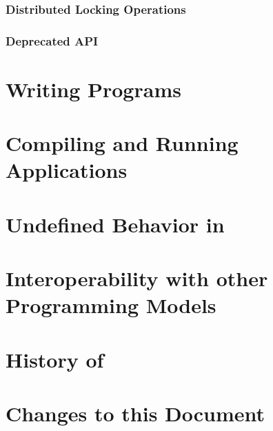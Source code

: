 \documentclass[10pt]{book}
\begin{document}
{%
\subsection{Distributed Locking Operations}
\subsection{Deprecated API}

\clearpage

\appendix
\chapter{Writing \openshmem Programs}

\chapter{Compiling and Running Applications}

\chapter{Undefined Behavior in \openshmem}
\label{sec:undefined}

\chapter{Interoperability with other Programming Models}
\label{sec:mpi}

\clearpage
\chapter{History of \openshmem{}}

\label{sec:openshmem_history}
\chapter{Changes to this Document}

%
} %
\end{document}
